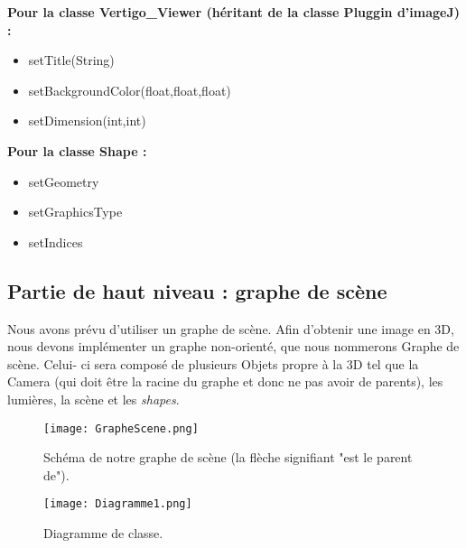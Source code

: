 \documentclass[11pt]{report}
\begin{document}
\textbf{Pour la classe Vertigo\_Viewer (héritant de la classe Pluggin d'imageJ) :}
\begin{itemize}
\item setTitle(String)
\item setBackgroundColor(float,float,float)
\item setDimension(int,int)
\end{itemize}


\textbf{Pour la classe Shape :}
\begin{itemize}
\item setGeometry %
\item setGraphicsType
\item setIndices %
\end{itemize}

\subsection{Partie de haut niveau : graphe de scène}
Nous avons prévu d'utiliser un graphe de scène. 
Afin d'obtenir une image en 3D, nous devons implémenter un graphe non-orienté, que nous nommerons Graphe de scène. Celui- ci sera composé de plusieurs Objets propre à la 3D tel que la Camera (qui doit être la racine du graphe et donc ne pas avoir de parents), les lumières, la scène et les  \textit{shapes}. 

\begin{figure}[h!]
  \caption{Schéma de notre graphe de scène (la flèche signifiant "est le parent de").}
  \centering
    \texttt{[image: GrapheScene.png]} 
    \label{SchemaGrapheSceneSimple}
\end{figure}
 
\begin{figure}[h!]
  \caption{Diagramme de classe.}
  \centering
    \texttt{[image: Diagramme1.png]}
\end{figure}
 
\end{document}
